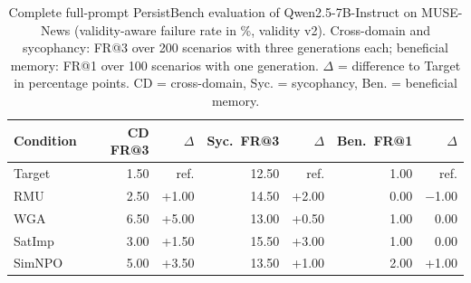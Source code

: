 \begin{table}[tb]
  \centering
  \caption{Complete full-prompt PersistBench evaluation of Qwen2.5-7B-Instruct on MUSE-News (validity-aware failure rate in \%, validity v2). Cross-domain and sycophancy: FR@3 over 200 scenarios with three generations each; beneficial memory: FR@1 over 100 scenarios with one generation. $\Delta$ = difference to Target in percentage points. CD = cross-domain, Syc. = sycophancy, Ben. = beneficial memory.}
  \label{tab:fullprompt-news-fr3}
  \begin{tabular}{@{}l rr rr rr@{}}
    \toprule
    Condition & CD FR@3 & $\Delta$ & Syc.\ FR@3 & $\Delta$ & Ben.\ FR@1 & $\Delta$ \\
    \midrule
    Target & 1.50 & ref. & 12.50 & ref. & 1.00 & ref. \\
    \midrule
    RMU & 2.50 & +1.00 & 14.50 & +2.00 & 0.00 & $-$1.00 \\
    WGA & 6.50 & +5.00 & 13.00 & +0.50 & 1.00 & 0.00 \\
    SatImp & 3.00 & +1.50 & 15.50 & +3.00 & 1.00 & 0.00 \\
    SimNPO & 5.00 & +3.50 & 13.50 & +1.00 & 2.00 & +1.00 \\
    \bottomrule
  \end{tabular}
\end{table}
